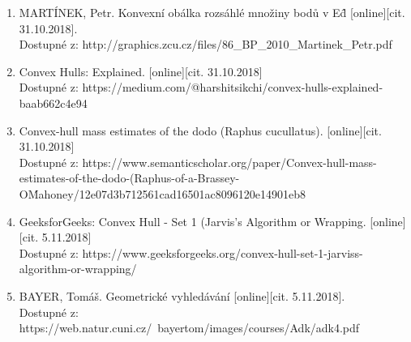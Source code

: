 \documentclass[a4paper, 12pt]{article}
\begin{document}
\begin{enumerate}
\item  MARTÍNEK, Petr. Konvexní obálka rozsáhlé množiny bodů v E\^d [online][cit. 31.10.2018]. \\
Dostupné z: http://graphics.zcu.cz/files/86\_BP\_2010\_Martinek\_Petr.pdf  \\

\item Convex Hulls: Explained. [online][cit. 31.10.2018]\\
Dostupné z: https://medium.com/@harshitsikchi/convex-hulls-explained-baab662c4e94\\

\item Convex-hull mass estimates of the dodo (Raphus cucullatus). [online][cit. 31.10.2018]\\
Dostupné z: https://www.semanticscholar.org/paper/Convex-hull-mass-estimates-of-the-dodo-(Raphus-of-a-Brassey-O\'Mahoney/12e07d3b712561cad16501ac8096120e14901eb8

\item GeeksforGeeks: Convex Hull - Set 1 (Jarvis's Algorithm or Wrapping. [online][cit. 5.11.2018]\\
Dostupné z: https://www.geeksforgeeks.org/convex-hull-set-1-jarviss-algorithm-or-wrapping/

\item  BAYER, Tomáš. Geometrické vyhledávání [online][cit. 5.11.2018]. \\
Dostupné z: https://web.natur.cuni.cz/~bayertom/images/courses/Adk/adk4.pdf  \\



\end{enumerate}
\end{document}
